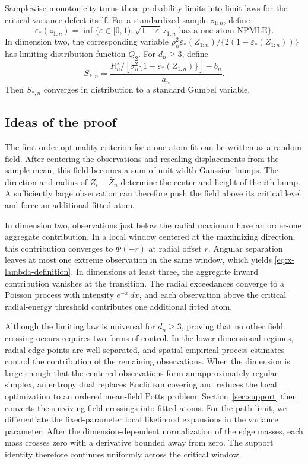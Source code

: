 \documentclass[11pt]{article}
\theoremstyle{remark}
\numberwithin{equation}{section}
\newcommand{\eps}{\varepsilon}
\begin{document}
Samplewise monotonicity turns these probability limits into limit laws for the
critical variance defect itself. For a standardized sample $z_{1:n}$, define
\[
    \eps_*(z_{1:n})
    =\inf\{\eps\in[0,1):\sqrt{1-\eps}\,z_{1:n}
       \text{ has a one-atom NPMLE}\}.
\]
In dimension two, the corresponding variable
\(\rho_n^2\eps_*(Z_{1:n})/\{2(1-\eps_*(Z_{1:n}))\}\) has limiting
distribution function \(Q_2\). For \(d_n\ge3\), define
\[
 S_{*,n}
 =\frac{R_n^\star/
     [\sigma_n^2\{1-\eps_*(Z_{1:n})\}]-b_n}{a_n}.
\]
Then \(S_{*,n}\) converges in distribution to a standard Gumbel variable.

\subsection{Ideas of the proof}
\label{sec:intro-proof-ideas}

The first-order optimality criterion for a one-atom fit can be written as a
random field. After centering the observations and rescaling displacements
from the sample mean, this field becomes a sum of unit-width Gaussian bumps.
The direction and radius of $Z_i-\bar Z_n$ determine the center and height of
the $i$th bump. A sufficiently large observation can therefore push the field
above its critical level and force an additional fitted atom.

In dimension two, observations just below the radial maximum have an order-one
aggregate contribution. In a local window centered at the maximizing
direction, this contribution converges to $\Phi(-r)$ at radial offset $r$.
Angular separation leaves at most one extreme observation in the same window,
which yields \eqref{eq:x-lambda-definition}. In dimensions at least three, the
aggregate inward contribution vanishes at the transition. The radial
exceedances converge to a Poisson process with intensity $e^{-x}\,dx$, and
each observation above the critical radial-energy threshold contributes one
additional fitted atom.

Although the limiting law is universal for $d_n\ge3$, proving that no other
field crossing occurs requires two forms of control. In the lower-dimensional
regimes, radial edge points are well separated, and spatial empirical-process
estimates control the contribution of the remaining observations. When the
dimension is large enough that the centered observations form an
approximately regular simplex, an entropy dual replaces Euclidean covering
and reduces the local optimization to an ordered mean-field Potts problem.
Section~\ref{sec:support} then converts the surviving field crossings into
fitted atoms. For the path limit, we differentiate the fixed-parameter local
likelihood expansions in the variance parameter. After the dimension-dependent
normalization of the edge masses, each mass crosses zero with a derivative
bounded away from zero. The support identity therefore continues uniformly
across the critical window.
\end{document}
